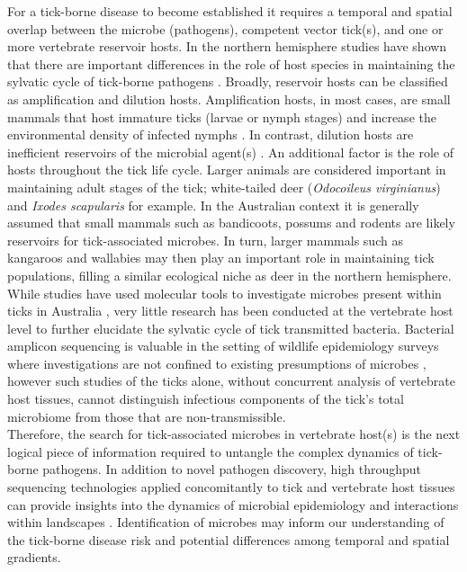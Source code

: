 \documentclass[a4paper, nobind]{templates/ociamthesis}
\begin{document}
For a tick-borne disease to become established it requires a temporal and spatial overlap between the microbe (pathogens), competent vector tick(s), and one or more vertebrate reservoir hosts.
In the northern hemisphere studies have shown that there are important differences in the role of host species in maintaining the sylvatic cycle of tick-borne pathogens \autocite{leviQuantifyingDilutionAmplification2016,huangHighBurdensIxodes2019,stewartmerrillMechanisticUnderstandingCompetence2020}.
Broadly, reservoir hosts can be classified as amplification and dilution hosts. Amplification hosts, in most cases, are small mammals that host immature ticks (larvae or nymph stages) and increase the environmental density of infected nymphs \autocite{leviQuantifyingDilutionAmplification2016}.
In contrast, dilution hosts are inefficient reservoirs of the microbial agent(s) \autocite{takumiImpactVertebrateCommunities2019,ginsbergWhyLymeDisease2021}.
An additional factor is the role of hosts throughout the tick life cycle.
Larger animals are considered important in maintaining adult stages of the tick; white-tailed deer (\emph{Odocoileus virginianus}) and \emph{Ixodes scapularis} \autocite{ostfeldTickborneDiseaseRisk2018} for example.
In the Australian context it is generally assumed that small mammals such as bandicoots, possums and rodents are likely reservoirs for tick-associated microbes.
In turn, larger mammals such as kangaroos and wallabies may then play an important role in maintaining tick populations, filling a similar ecological niche as deer in the northern hemisphere.
While studies have used molecular tools to investigate microbes present within ticks in Australia \autocite{goftonPhylogeneticCharacterisationTwo2016,lohMolecularSurveillancePiroplasms2018,moonAustralianPenguinTicks2018}, very little research has been conducted at the vertebrate host level to further elucidate the sylvatic cycle of tick transmitted bacteria.
Bacterial amplicon sequencing is valuable in the setting of wildlife epidemiology surveys where investigations are not confined to existing presumptions of microbes \autocite{galan16SRRNAAmplicon2016}, however such studies of the ticks alone, without concurrent analysis of vertebrate host tissues, cannot distinguish infectious components of the tick's total microbiome from those that are non-transmissible.\\
Therefore, the search for tick-associated microbes in vertebrate host(s) is the next logical piece of information required to untangle the complex dynamics of tick-borne pathogens.
In addition to novel pathogen discovery, high throughput sequencing technologies applied concomitantly to tick and vertebrate host tissues can provide insights into the dynamics of microbial epidemiology and interactions within landscapes \autocite{titcombHighThroughputSequencingUnderstanding2019}.
Identification of microbes may inform our understanding of the tick-borne disease risk and potential differences among temporal and spatial gradients.
\end{document}
